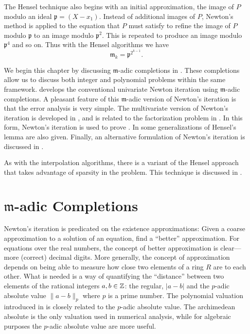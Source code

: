 The Hensel technique also begins with an initial approximation, the
image of $P$ modulo an ideal $\mathfrak{p} = (X - x_1)$.  Instead of
additional images of $P$, Newton's method is applied to the equation that 
$P$ must satisfy to refine the image of $P$ modulo $\mathfrak{p}$ to an 
image modulo $\mathfrak{p}^2$.  This is repeated to produce an image modulo 
$\mathfrak{p}^4$ and so on.  Thus with the Hensel algorithms we have 
\[
\mathfrak{m}_k = \mathfrak{p}^{2^{k-1}}.
\]

\medskip
We begin this chapter by discussing $\mathfrak{m}$-adic completions in 
.  These completions allow us to discuss
both integer and polynomial problems within the same framework.
 develops the conventional univariate
Newton iteration using $\mathfrak{m}$-adic completions.  A pleasant
feature of this $\mathfrak{m}$-adic version of Newton's iteration is that
the error analysis is very simple.  The multivariate version of
Newton's iteration is developed in ,
and is related to the factorization problem in
.  In this form, Newton's iteration is used to 
prove .  In  some 
generalizations of Hensel's lemma are also given.  Finally, an 
alternative formulation of Newton's iteration is discussed in 
.

As with the interpolation algorithms, there is a variant of the Hensel
approach that takes advantage of sparsity in the problem.  This
technique is discussed in .

\section{\texorpdfstring{$\mathfrak{m}$}{m}-adic Completions}
\label{madic:Arith:Sec}

Newton's iteration is predicated on the existence approximations:
Given a coarse approximation to a solution of an equation, find a
``better'' approximation.  For equations over the real numbers, the
concept of better approximation is clear---more (correct) decimal
digits.  More generally, the concept of approximation depends on being
able to measure how close two elements of a ring $R$ are to each
other.  What is needed is a way of quantifying the ``distance''
between two elements of the rational integers $a,b \in \mathbb{Z}$: the
regular,  $|a - b|$ and the $p$-adic
absolute value $\|a - b\|_p$ where $p$ is a prime number.  The
polynomial valuation introduced in  is closely
related to the $p$-adic absolute value.  The archimedean absolute is
the only valuation used in numerical analysis, while for algebraic
purposes the $p$-adic absolute value are more useful.


